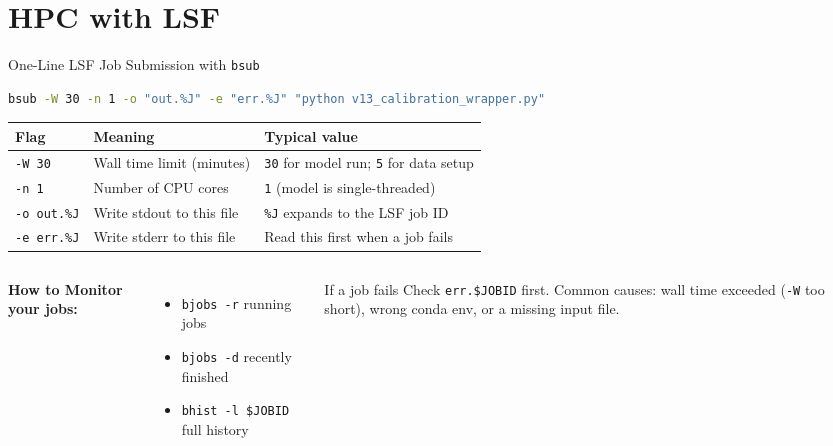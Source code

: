 \documentclass[aspectratio=169, 11pt]{beamer}
\begin{document}
\section{HPC with LSF}

\begin{frame}[fragile]{One-Line LSF Job Submission with \texttt{bsub}}
  \begin{lstlisting}[language=bash, basicstyle=\ttfamily\scriptsize]
bsub -W 30 -n 1 -o "out.%J" -e "err.%J" "python v13_calibration_wrapper.py"
  \end{lstlisting}
  \begin{table}
    \centering
    \small
    \begin{tabular}{lll}
      \toprule
      \textbf{Flag} & \textbf{Meaning} & \textbf{Typical value} \\
      \midrule
      \texttt{-W 30}      & Wall time limit (minutes)       & \texttt{30} for model run; \texttt{5} for data setup \\
      \texttt{-n 1}       & Number of CPU cores             & \texttt{1} (model is single-threaded) \\
      \texttt{-o out.\%J} & Write stdout to this file       & \texttt{\%J} expands to the LSF job ID \\
      \texttt{-e err.\%J} & Write stderr to this file       & Read this first when a job fails \\
      \bottomrule
    \end{tabular}
  \end{table}
  \vspace{1em}
  \begin{columns}[T]
    \vspace{0.2em}
      \textbf{How to Monitor your jobs:}
      \begin{itemize}
        \item \texttt{bjobs -r} \quad\quad running jobs
        \item \texttt{bjobs -d} \quad\quad recently finished
        \item \texttt{bhist -l \$JOBID} \quad full history
      \end{itemize}
      \begin{block}{If a job fails}
        Check \texttt{err.\$JOBID} first.
        Common causes: wall time exceeded (\texttt{-W} too short),
        wrong conda env, or a missing input file.
      \end{block}
  \end{columns}
\end{frame}
\end{document}
